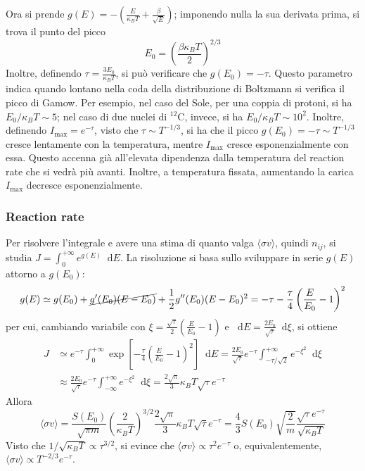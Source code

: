 \documentclass[11pt, a4paper]{scrartcl}
\theoremstyle{style}
\theoremstyle{style1}
\newcommand{\dd}{\mathop{}\!\mathrm{d}}
\numberwithin{equation}{subsection}
\begin{document}
Ora si prende $g(E) = - \left(\frac{E}{\kappa _B T } + \frac{\beta}{\sqrt{E} }\right) $; imponendo nulla la sua derivata prima, si trova il punto del picco 
\[
E_0 = \left(\frac{\beta \kappa _B T}{2}\right) ^{2 / 3} 
\] 
Inoltre, definendo $\tau = \frac{3E_0}{\kappa _BT }$, si pu\`o verificare che $g(E_0) = -\tau $.
Questo parametro indica quando lontano nella coda della distribuzione di Boltzmann si verifica il picco di Gamow. 
Per esempio, nel caso del Sole, per una coppia di protoni, si ha $E_0 / \kappa _B T \sim 5$; nel caso di due nuclei di $^{12} \mathrm{C} $, invece, si ha $E_0 / \kappa _BT \sim 10^2$.
Inoltre, definendo $I_\text{max} = e^{-\tau }$, visto che $\tau \sim T^{-1 / 3}$, si ha che il picco $g(E_0)=-\tau \sim T^{-1 / 3} $ cresce lentamente con la temperatura, mentre $I_\text{max}$ cresce esponenzialmente con essa.
Questo accenna gi\`a all'elevata dipendenza dalla temperatura del reaction rate che si vedr\`a pi\`u avanti.
Inoltre, a temperatura fissata, aumentando la carica $I_\text{max}$ decresce esponenzialmente.

\subsubsection{Reaction rate}

Per risolvere l'integrale e avere una stima di quanto valga $\langle \sigma v \rangle$, quindi $n_{ij} $, si studia $J = \int _0^{+\infty} e^{g(E)}\dd E$. 
La risoluzione si basa sullo sviluppare in serie $g(E)$ attorno a $g(E_0)$:
\[
	g(E) \simeq g(E_0) + \cancel{g'(E_0) (E-E_0)} + \frac{1}{2} g''(E_0) (E-E_0)^2 = -\tau - \frac{\tau }{4} \left(\frac{E}{E_0}-1\right) ^2
\] 
per cui, cambiando variabile con $\xi  = \frac{\sqrt{\tau } }{2} \left(\frac{E}{E_0}-1\right) $ e $\dd E = \frac{2E_0}{\sqrt{\tau } }\dd \xi $, si ottiene
\[
	\begin{split}
		J &\simeq e^{-\tau } \int _0^{+\infty} \exp \left[ - \frac{\tau}{4} \left(\frac{E}{E_0}-1\right) ^2 \right] \dd E = \frac{2E_0}{\sqrt{\tau } } e^{-\tau } \int _{- \tau  / \sqrt{2} } ^{+\infty} e^{-\xi ^2} \dd \xi \\
		  &\approx  \frac{2E_0}{\sqrt{\tau } }e^{-\tau } \int _{-\infty} ^{+\infty} e^{-\xi ^2}\dd \xi = \frac{2\sqrt{\pi} }{3}\kappa _BT \sqrt{\tau }  e^{-\tau }
	\end{split}
\] 
Allora 
\[
\langle \sigma v \rangle = \frac{S(E_0)}{\sqrt{\pi m} } \left(\frac{2}{\kappa _BT}\right) ^{3 / 2}\frac{2\sqrt{\pi} }{3}\kappa _BT \sqrt{\tau }  e^{-\tau }= \frac{4}{3}S(E_0) \sqrt{\frac{2}{m}} \frac{\sqrt{\tau } e^{-\tau }}{\sqrt{\kappa _BT} }
\] 
Visto che $1 / \sqrt{\kappa _B T} \propto \tau ^{3 / 2} $, si evince che $\langle \sigma v \rangle \propto \tau ^2 e^{-\tau }$ o, equivalentemente, $\langle \sigma v \rangle \propto T^{-2 / 3} e^{-\tau }$.
\end{document}
